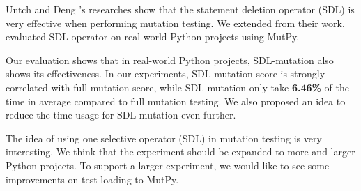 \documentclass[12pt]{article}
\begin{document}
Untch \cite{untch2009reduced} and Deng \cite{deng2013empirical}'s researches show that the statement deletion operator (SDL) is very effective when performing mutation testing. We extended from their work, evaluated SDL operator on real-world Python projects using MutPy.

Our evaluation shows that in real-world Python projects, SDL-mutation also shows its effectiveness. In our experiments, SDL-mutation score is strongly correlated with full mutation score, while SDL-mutation only take \textbf{6.46\%} of the time in average compared to full mutation testing. We also proposed an idea to reduce the time usage for SDL-mutation even further.

The idea of using one selective operator (SDL) in mutation testing is very interesting. We think that the experiment should be expanded to more and larger Python projects. To support a larger experiment, we would like to see some improvements on test loading to MutPy.



\end{document}
